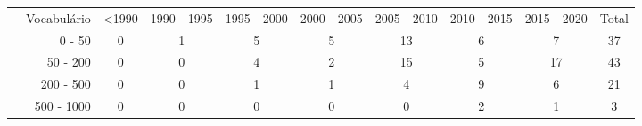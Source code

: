 \begin{table}[]
{\begin{tabular}{lrcccccccc}
                                                                         & \multicolumn{1}{r|}{\cellcolor[HTML]{EFEFEF}Vocabulário}                   & \cellcolor[HTML]{EFEFEF}\textless 1990           & \cellcolor[HTML]{EFEFEF}1990 - 1995 & \cellcolor[HTML]{EFEFEF}1995 - 2000 & \cellcolor[HTML]{EFEFEF}2000 - 2005 & \cellcolor[HTML]{EFEFEF}2005 - 2010 & \cellcolor[HTML]{EFEFEF}2010 - 2015 & \multicolumn{1}{c|}{\cellcolor[HTML]{EFEFEF}2015 - 2020} & \cellcolor[HTML]{EFEFEF}Total                   \\ \cline{2-10}
                                                                         & \multicolumn{1}{r|}{0 - 50}                                                & 0                                                & \cellcolor[HTML]{FFFDFA}1           & \cellcolor[HTML]{FFF7E6}5           & \cellcolor[HTML]{FFF7E6}5           & \cellcolor[HTML]{FFEABF}13          & \cellcolor[HTML]{FFF5E1}6           & \multicolumn{1}{c|}{\cellcolor[HTML]{FFF3DC}7}           & 37                                              \\
                                                                         & \multicolumn{1}{r|}{50 - 200}                                              & 0                                                & 0                                   & \cellcolor[HTML]{FFF8EB}4           & \cellcolor[HTML]{FFFCF5}2           & \cellcolor[HTML]{FFE6B5}15          & \cellcolor[HTML]{FFF7E6}5           & \multicolumn{1}{c|}{\cellcolor[HTML]{FFE3AB}17}          & 43                                              \\
                                                                         & \multicolumn{1}{r|}{200 - 500}                                             & 0                                                & 0                                   & \cellcolor[HTML]{FFFDFA}1           & \cellcolor[HTML]{FFFDFA}1           & \cellcolor[HTML]{FFF8EB}4           & \cellcolor[HTML]{FFF0D3}9           & \multicolumn{1}{c|}{\cellcolor[HTML]{FFF5E1}6}           & 21                                              \\
                                                                         & \multicolumn{1}{r|}{500 - 1000}                                            & 0                                                & 0                                   & 0                                   & 0                                   & 0                                   & \cellcolor[HTML]{FFFCF5}2           & \multicolumn{1}{c|}{\cellcolor[HTML]{FFFDFA}1}           & 3                                               \\

\end{tabular}}
\end{table}
